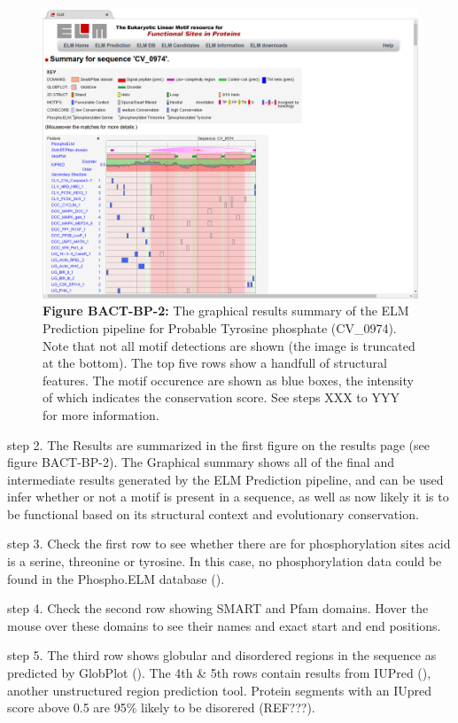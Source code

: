 \begin{figure}[h!]
\centering
\includegraphics[width=\textwidth]{Figures/BACT_1/elm_results_summary.png}
\caption{
\textbf{Figure BACT-BP-2:}
The graphical results summary of the ELM
Prediction pipeline for Probable Tyrosine phosphate (CV\_0974). Note
that not all motif detections are shown (the image is truncated at the
bottom). The top five rows show a handfull of structural features. The
motif occurence are shown as blue boxes, the intensity of which
indicates the conservation score. See steps XXX to YYY for more
information.
}
\end{figure}

step 2. The Results are summarized in the first figure on the results
page (see figure BACT-BP-2). The Graphical summary shows all of the
final and intermediate results generated by the ELM Prediction pipeline,
and can be used infer whether or not a motif is present in a sequence,
as well as now likely it is to be functional based on its structural
context and evolutionary conservation.

step 3. Check the first row to see whether there are for phosphorylation
sites acid is a serine, threonine or tyrosine. In this case, no
phosphorylation data could be found in the Phospho.ELM database
(\cite{21062810}).

step 4. Check the second row showing SMART and Pfam domains. Hover the
mouse over these domains to see their names and exact start and end
positions.

step 5. The third row shows globular and disordered regions in the
sequence as predicted by GlobPlot (\cite{12824398}). The 4th \& 5th rows
contain results from IUPred (\cite{15955779}), another unstructured
region prediction tool. Protein segments with an IUpred score above 0.5
are 95\% likely to be disorered (REF???).

